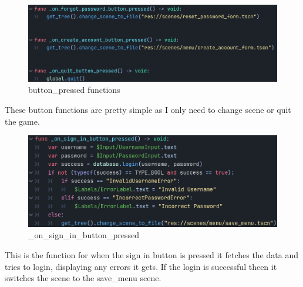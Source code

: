 \documentclass{article}
\begin{document}
        \[\]
        \begin{figure}[H]
              \centering
              \includegraphics{images/development/LoginForm_buttons.PNG}  
              \caption{button\_pressed functions}
        \end{figure}
        These button functions are pretty simple as I only need to change scene or quit the game.\\
        \begin{figure}[H]
                \centering
                \includegraphics{images/development/_on_sign_in_button_pressed.PNG}
                \caption{\_on\_sign\_in\_button\_pressed}
        \end{figure}
        \[\]
        This is the function for when the sign in button is pressed it fetches the data and tries to login, displaying any errors it gets. If the login is successful theen it switches the scene to the save\_menu scene.\\
\end{document}
